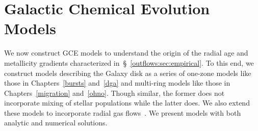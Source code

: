 
\section{Galactic Chemical Evolution Models}
\label{outflows:sec:gce}
We now construct GCE models to understand the origin of the radial age and
metallicity gradients characterized in~\S~\ref{outflows:sec:empirical}.
To this end, we construct models describing the Galaxy disk as a series of
one-zone models like those in Chapters~\ref{bursts} and~\ref{dga} and
multi-ring models like those in Chapters~\ref{migration} and~\ref{ohno}.
Though similar, the former does not incorporate mixing of stellar populations
while the latter does.
We also extend these models to incorporate radial gas
flows~\citep[e.g.,][]{Lacey1985, Bilitewski2012}.
We present models with both analytic and numerical solutions.


